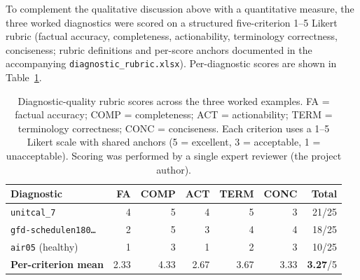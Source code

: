 \documentclass[11pt]{article}
\begin{document}
To complement the qualitative discussion above with a quantitative measure, the three worked diagnostics were scored on a structured five-criterion 1--5 Likert rubric (factual accuracy, completeness, actionability, terminology correctness, conciseness; rubric definitions and per-score anchors documented in the accompanying \texttt{diagnostic\_rubric.xlsx}). Per-diagnostic scores are shown in Table~\ref{tab:rubric}.

\begin{table}[h]
\centering
\begin{tabular}{lrrrrrr}
\toprule
\textbf{Diagnostic} & \textbf{FA} & \textbf{COMP} & \textbf{ACT} & \textbf{TERM} & \textbf{CONC} & \textbf{Total} \\
\midrule
\texttt{unitcal\_7}            & 4 & 5 & 4 & 5 & 3 & 21/25 \\
\texttt{gfd-schedulen180\ldots} & 2 & 5 & 3 & 4 & 4 & 18/25 \\
\texttt{air05} (healthy)        & 1 & 3 & 1 & 2 & 3 & 10/25 \\
\midrule
\textbf{Per-criterion mean}     & 2.33 & 4.33 & 2.67 & 3.67 & 3.33 & \textbf{3.27}/5 \\
\bottomrule
\end{tabular}
\caption{Diagnostic-quality rubric scores across the three worked examples. FA = factual accuracy; COMP = completeness; ACT = actionability; TERM = terminology correctness; CONC = conciseness. Each criterion uses a 1--5 Likert scale with shared anchors (5 = excellent, 3 = acceptable, 1 = unacceptable). Scoring was performed by a single expert reviewer (the project author).}
\label{tab:rubric}
\end{table}
\end{document}
